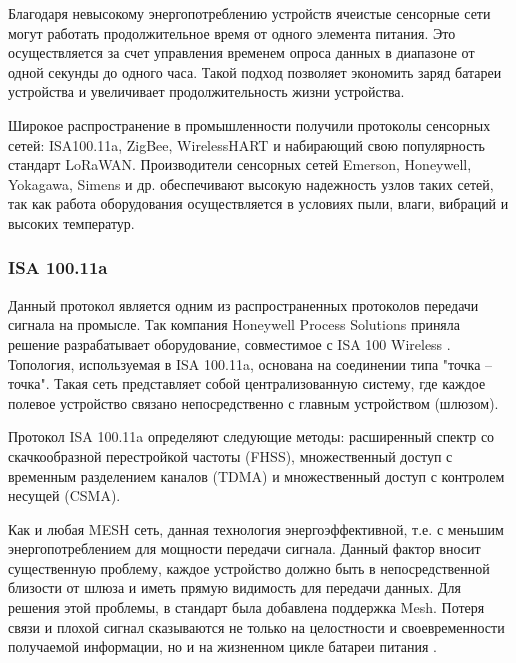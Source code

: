 Благодаря невысокому энергопотреблению устройств ячеистые сенсорные сети могут работать продолжительное время от одного элемента питания. Это осуществляется за счет управления временем опроса данных в диапазоне от одной секунды до одного часа. Такой подход позволяет  экономить заряд батареи устройства и увеличивает продолжительность жизни устройства.

Широкое распространение в промышленности получили протоколы сенсорных сетей: ISA100.11a, ZigBee, WirelessHART и набирающий свою популярность стандарт LoRaWAN. Производители сенсорных сетей Emerson, Honeywell, Yokagawa, Simens и др. обеспечивают высокую надежность узлов таких сетей, так как работа оборудования осуществляется в условиях пыли, влаги, вибраций и высоких температур.

\subsubsection{ISA 100.11a}
Данный протокол является одним из распространенных протоколов передачи сигнала на промысле. Так компания Honeywell Process Solutions приняла решение разрабатывает оборудование, совместимое с ISA 100 Wireless \cite{Sidney2015}.
Топология, используемая в ISA 100.11a, основана на соединении типа "точка -- точка". Такая сеть представляет собой централизованную систему, где каждое полевое устройство связано непосредственно с главным устройством (шлюзом). 

Протокол ISA 100.11a определяют следующие методы: расширенный спектр со скачкообразной перестройкой частоты (FHSS), множественный доступ с временным разделением каналов (TDMA) и множественный доступ с контролем несущей (CSMA).

Как и любая MESH сеть, данная технология энергоэффективной, т.е. с меньшим энергопотреблением для мощности передачи сигнала. Данный фактор вносит существенную проблему, каждое устройство должно быть в непосредственной близости от шлюза и иметь прямую видимость для передачи данных. Для решения этой проблемы, в стандарт была добавлена поддержка Mesh. Потеря связи и плохой сигнал сказываются не только на целостности и своевременности получаемой информации, но и на жизненном цикле батареи питания \cite{Tagirov2013}.

